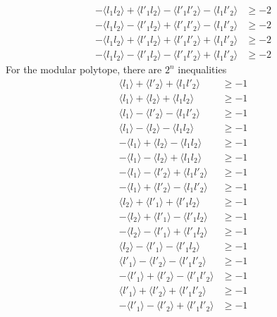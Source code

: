 \documentclass[10pt]{article}
\begin{document}
\begin{equation}
\begin{aligned}
-\langle l_1 l_2 \rangle + \langle l'_1 l_2 \rangle - \langle l'_1 l'_2 \rangle - \langle l_1 l'_2 \rangle &\geq -2\\
-\langle l_1 l_2 \rangle - \langle l'_1 l_2 \rangle + \langle l'_1 l'_2 \rangle - \langle l_1 l'_2 \rangle &\geq -2\\
-\langle l_1 l_2 \rangle + \langle l'_1 l_2 \rangle + \langle l'_1 l'_2 \rangle + \langle l_1 l'_2 \rangle &\geq -2\\
-\langle l_1 l_2 \rangle - \langle l'_1 l_2 \rangle - \langle l'_1 l'_2 \rangle + \langle l_1 l'_2 \rangle &\geq -2
\end{aligned}
\end{equation}
For the modular polytope, there are $2^n$ inequalities
\begin{equation}
\begin{aligned}\label{eq:modineq}
\langle l_1 \rangle + \langle l'_2 \rangle + \langle l_1 l'_2 \rangle &\geq -1\\
\langle l_1 \rangle + \langle l_2 \rangle + \langle l_1 l_2 \rangle &\geq -1\\
\langle l_1 \rangle - \langle l'_2 \rangle - \langle l_1 l'_2 \rangle &\geq -1\\
\langle l_1 \rangle - \langle l_2 \rangle - \langle l_1 l_2 \rangle &\geq -1\\
-\langle l_1 \rangle + \langle l_2 \rangle - \langle l_1 l_2 \rangle &\geq -1\\
-\langle l_1 \rangle - \langle l_2 \rangle + \langle l_1 l_2 \rangle &\geq -1\\
-\langle l_1 \rangle - \langle l'_2 \rangle + \langle l_1 l'_2 \rangle &\geq -1\\
-\langle l_1 \rangle + \langle l'_2 \rangle - \langle l_1 l'_2 \rangle &\geq -1\\
\langle l_2 \rangle + \langle l'_1 \rangle + \langle l'_1 l_2 \rangle &\geq -1\\
-\langle l_2 \rangle + \langle l'_1 \rangle - \langle l'_1 l_2 \rangle &\geq -1\\
-\langle l_2 \rangle - \langle l'_1 \rangle + \langle l'_1 l_2 \rangle &\geq -1\\
\langle l_2 \rangle - \langle l'_1 \rangle - \langle l'_1 l_2 \rangle &\geq -1\\
\langle l'_1 \rangle - \langle l'_2 \rangle - \langle l'_1 l'_2 \rangle &\geq -1\\
-\langle l'_1 \rangle + \langle l'_2 \rangle - \langle l'_1 l'_2 \rangle &\geq -1\\
\langle l'_1 \rangle + \langle l'_2 \rangle + \langle l'_1 l'_2 \rangle &\geq -1\\
-\langle l'_1 \rangle - \langle l'_2 \rangle + \langle l'_1 l'_2 \rangle &\geq -1
\end{aligned}
\end{equation}
\end{document}
